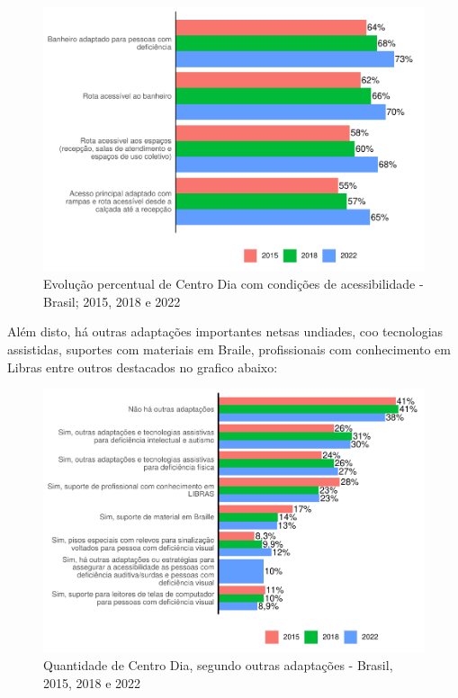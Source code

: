\documentclass[
  brazilian]{report}
\begin{document}
\begin{figure}
\includegraphics{Censo-SUAS-2022_files/figure-latex/cdia-acessibilidade-1} \caption[Evolução percentual de Centro Dia com condições de acessibilidade - Brasil]{Evolução percentual de Centro Dia com condições de acessibilidade - Brasil; 2015, 2018 e 2022}\label{fig:cdia-acessibilidade}
\end{figure}

Além disto, há outras adaptações importantes netsas undiades, coo
tecnologias assistidas, suportes com materiais em Braile, profissionais
com conhecimento em Libras entre outros destacados no grafico abaixo:

\begin{figure}
\includegraphics{Censo-SUAS-2022_files/figure-latex/cdia_adaptações-1} \caption[Quantidade de Centro Dia, segundo outras adaptações - Brasil, 2015, 2018 e 2022]{Quantidade de Centro Dia, segundo outras adaptações - Brasil, 2015, 2018 e 2022}\label{fig:cdia_adaptações}
\end{figure}
\end{document}
